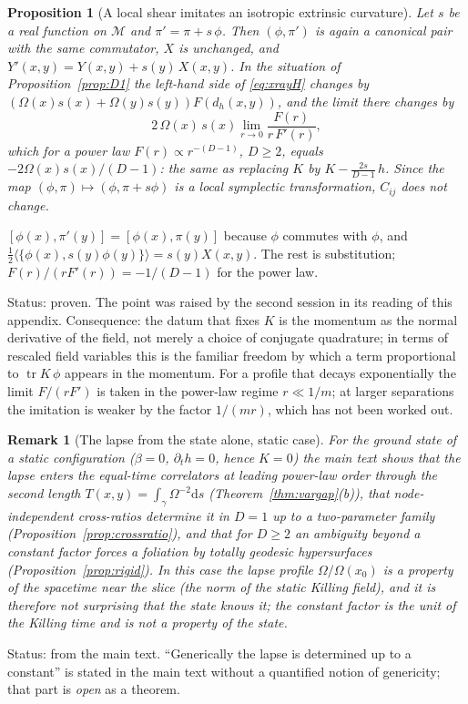 \documentclass[11pt,a4paper]{article}
\makeatletter
\theoremstyle{stmt}
\newtheorem{proposition}[theorem]{Proposition}
\theoremstyle{defn}
\theoremstyle{rmk}
\newtheorem{remark}[theorem]{Remark}
\renewenvironment{proof}[1][\proofname]{\par\pushQED{\qed}\normalfont\topsep6\p@\@plus6\p@\relax
  \trivlist\item[\hskip\labelsep{\sffamily\itshape\small #1.}]\ignorespaces}{\popQED\endtrivlist\@endpefalse}
\numberwithin{equation}{section}
\DeclareMathOperator{\tr}{tr}
\newcommand{\status}[1]{\par\noindent\textsf{\small Status: #1}\par}
\newcommand{\M}{\mathcal{M}}
\newcommand{\dd}{\mathrm{d}}
\makeatother
\begin{document}
{\begin{proposition}[A local shear imitates an isotropic extrinsic curvature]\label{prop:shear}
Let $s$ be a real function on $\M$ and $\pi'=\pi+s\,\phi$. Then $(\phi,\pi')$ is again a canonical pair with the same commutator, $X$ is unchanged, and $Y'(x,y)=Y(x,y)+s(y)\,X(x,y)$. In the situation of Proposition~\ref{prop:D1} the left-hand side of \eqref{eq:xrayH} changes by $(\Omega(x)s(x)+\Omega(y)s(y))F(d_h(x,y))$, and the limit there changes by
\[
2\,\Omega(x)\,s(x)\lim_{r\to0}\frac{F(r)}{r\,F'(r)} ,
\]
which for a power law $F(r)\propto r^{-(D-1)}$, $D\ge2$, equals $-2\Omega(x)s(x)/(D-1)$: the same as replacing $K$ by $K-\frac{2s}{D-1}\,h$. Since the map $(\phi,\pi)\mapsto(\phi,\pi+s\phi)$ is a local symplectic transformation, $C_{ij}$ does not change.
\end{proposition}

\begin{proof}
$[\phi(x),\pi'(y)]=[\phi(x),\pi(y)]$ because $\phi$ commutes with $\phi$, and $\tfrac12\langle\{\phi(x),s(y)\phi(y)\}\rangle=s(y)X(x,y)$. The rest is substitution; $F(r)/(rF'(r))=-1/(D-1)$ for the power law.
\end{proof}
\status{proven. The point was raised by the second session in its reading of this appendix. Consequence: the datum that fixes $K$ is the momentum as the normal derivative of the field, not merely a choice of conjugate quadrature; in terms of rescaled field variables this is the familiar freedom by which a term proportional to $\tr K\,\phi$ appears in the momentum. For a profile that decays exponentially the limit $F/(rF')$ is taken in the power-law regime $r\ll1/m$; at larger separations the imitation is weaker by the factor $1/(mr)$, which has not been worked out.}

\begin{remark}[The lapse from the state alone, static case]\label{rem:static}
For the ground state of a static configuration ($\beta=0$, $\partial_th=0$, hence $K=0$) the main text shows that the lapse enters the equal-time correlators at leading power-law order through the second length $T(x,y)=\int_\gamma\Omega^{-2}\dd s$ (Theorem~\ref{thm:vargap}(b)), that node-independent cross-ratios determine it in $D=1$ up to a two-parameter family (Proposition~\ref{prop:crossratio}), and that for $D\ge2$ an ambiguity beyond a constant factor forces a foliation by totally geodesic hypersurfaces (Proposition~\ref{prop:rigid}). In this case the lapse profile $\Omega/\Omega(x_0)$ is a property of the spacetime near the slice (the norm of the static Killing field), and it is therefore not surprising that the state knows it; the constant factor is the unit of the Killing time and is not a property of the state.
\end{remark}
\status{from the main text. ``Generically the lapse is determined up to a constant'' is stated in the main text without a quantified notion of genericity; that part is \emph{open} as a theorem.}

}
\end{document}
